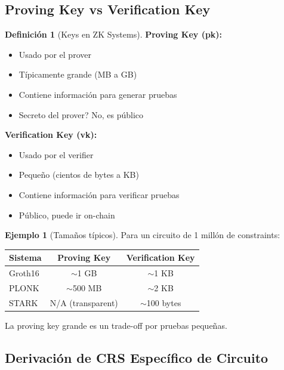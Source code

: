 \documentclass[11pt,a4paper,twoside,openright]{book}
\theoremstyle{definition}
\newtheorem{definition}{Definición}[chapter]
\newtheorem{example}{Ejemplo}[chapter]
\theoremstyle{plain}
\theoremstyle{remark}
\begin{document}
\subsection{Proving Key vs Verification Key}

\begin{definition}[Keys en ZK Systems]
\textbf{Proving Key (pk):}
\begin{itemize}
    \item Usado por el prover
    \item Típicamente grande (MB a GB)
    \item Contiene información para generar pruebas
    \item Secreto del prover? No, es público
\end{itemize}

\textbf{Verification Key (vk):}
\begin{itemize}
    \item Usado por el verifier
    \item Pequeño (cientos de bytes a KB)
    \item Contiene información para verificar pruebas
    \item Público, puede ir on-chain
\end{itemize}
\end{definition}

\begin{example}[Tamaños típicos]
Para un circuito de 1 millón de constraints:

\begin{center}
\begin{tabular}{lcc}
\toprule
\textbf{Sistema} & \textbf{Proving Key} & \textbf{Verification Key} \\
\midrule
Groth16 & $\sim$1 GB & $\sim$1 KB \\
PLONK & $\sim$500 MB & $\sim$2 KB \\
STARK & N/A (transparent) & $\sim$100 bytes \\
\bottomrule
\end{tabular}
\end{center}

La proving key grande es un trade-off por pruebas pequeñas.
\end{example}

\subsection{Derivación de CRS Específico de Circuito}
\end{document}
